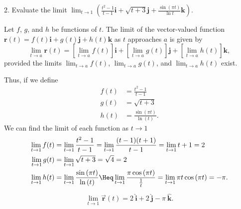 \documentclass{report}
\begin{document}
    \bigbreak \noindent 
    \begin{mdframed}
        2. Evaluate the limit $\lim_{t \to 1} \left( \frac{t^2 - 1}{t - 1} \mathbf{i} + \sqrt{t + 3} \mathbf{j} + \frac{\sin(\pi t)}{\ln t} \mathbf{k} \right)$. 
    \end{mdframed}
    \bigbreak \noindent 
    \begin{remark}
        Let \(f\), \(g\), and \(h\) be functions of \(t\). 
        The limit of the vector-valued function  \(\mathbf{r}(t) = f(t)\mathbf{i} + g(t)\mathbf{j} + h(t)\mathbf{k}\) as \(t\) approaches \(a\) is given by
        \[
            \lim_{t \to a} \mathbf{r}(t) = \left[ \lim_{t \to a} f(t) \right]\mathbf{i} + \left[ \lim_{t \to a} g(t) \right]\mathbf{j} + \left[ \lim_{t \to a} h(t) \right]\mathbf{k},
        \]
        provided the limits  \(\lim_{t \to a} f(t)\), \(\lim_{t \to a} g(t)\), and \(\lim_{t \to a} h(t)\) exist.
    \end{remark}
    \bigbreak \noindent 
    Thus, if we define 
    \begin{align*}
        f(t) &= \frac{t^{2}-1}{t-1} \\
        g(t) &= \sqrt{t+3} \\
        h(t) &= \frac{\sin{\left(\pi t\right)}}{\ln{(t)}}
    .\end{align*}
    \bigbreak \noindent 
    We can find the limit of each function as $t \to 1$
    \begin{align*}
        \lim\limits_{t \to 1}{f(t)} &= \lim\limits_{t \to 1}{\frac{t^{2}-1}{t-1}} = \lim\limits_{t \to 1}{\frac{(t-1)(t+1)}{t-1}} = \lim\limits_{t \to 1}{t+1} = 2 \\
        \lim\limits_{t \to 1}{g(t)} &= \lim\limits_{t \to 1}{\sqrt{t+3}} = \sqrt{4} = 2\\
        \lim\limits_{t \to 1}{h(t)} &= \lim\limits_{t \to 1}{\frac{\sin{\left(\pi t\right)}}{\ln{(t)}}} \Heq \lim\limits_{t \to 1}{\frac{\pi\cos{\left(\pi t\right)}}{\frac{1}{t}}} = \lim\limits_{t \to 1}{\pi t \cos{\left(\pi t\right)}} = -\pi
    .\end{align*}
    \begin{align*}
        \lim\limits_{t \to 1}{\vec{\mathbf{r}}(t)} = 2\ \hat{\mathbf{i}} + 2\ \hat{\mathbf{j}} -\pi\ \hat{\mathbf{k}}
    .\end{align*}
    
\end{document}
